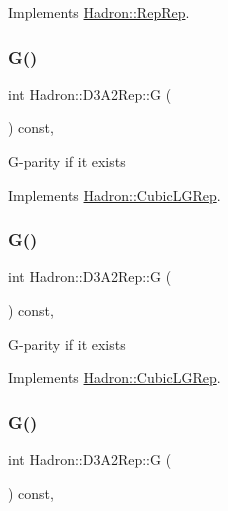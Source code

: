 Implements \mbox{\hyperlink{structHadron_1_1RepRep_a92c8802e5ed7afd7da43ccfd5b7cd92b}{Hadron\+::\+Rep\+Rep}}.

\mbox{\label{structHadron_1_1D3A2Rep_a2d35804ba790c296d4f0d984adc7e7c9}} 
\subsubsection{\texorpdfstring{G()}{G()}\hspace{0.1cm}{\footnotesize\ttfamily [1/3]}}
{\footnotesize\ttfamily int Hadron\+::\+D3\+A2\+Rep\+::G (\begin{DoxyParamCaption}{ }\end{DoxyParamCaption}) const\hspace{0.3cm}{\ttfamily [inline]}, {\ttfamily [virtual]}}

G-\/parity if it exists 

Implements \mbox{\hyperlink{structHadron_1_1CubicLGRep_ace26f7b2d55e3a668a14cb9026da5231}{Hadron\+::\+Cubic\+L\+G\+Rep}}.

\mbox{\label{structHadron_1_1D3A2Rep_a2d35804ba790c296d4f0d984adc7e7c9}} 
\subsubsection{\texorpdfstring{G()}{G()}\hspace{0.1cm}{\footnotesize\ttfamily [2/3]}}
{\footnotesize\ttfamily int Hadron\+::\+D3\+A2\+Rep\+::G (\begin{DoxyParamCaption}{ }\end{DoxyParamCaption}) const\hspace{0.3cm}{\ttfamily [inline]}, {\ttfamily [virtual]}}

G-\/parity if it exists 

Implements \mbox{\hyperlink{structHadron_1_1CubicLGRep_ace26f7b2d55e3a668a14cb9026da5231}{Hadron\+::\+Cubic\+L\+G\+Rep}}.

\mbox{\label{structHadron_1_1D3A2Rep_a2d35804ba790c296d4f0d984adc7e7c9}} 
\subsubsection{\texorpdfstring{G()}{G()}\hspace{0.1cm}{\footnotesize\ttfamily [3/3]}}
{\footnotesize\ttfamily int Hadron\+::\+D3\+A2\+Rep\+::G (\begin{DoxyParamCaption}{ }\end{DoxyParamCaption}) const\hspace{0.3cm}{\ttfamily [inline]}, {\ttfamily [virtual]}}

